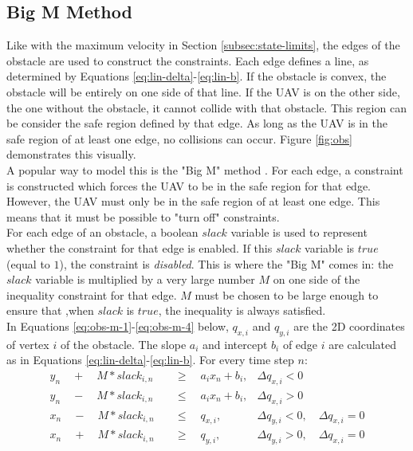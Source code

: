 \subsection{Big M Method}
Like with the maximum velocity in Section \ref{subsec:state-limits}, the edges of the obstacle are used to construct the constraints. Each edge defines a line, as determined by Equations \ref{eq:lin-delta}-\ref{eq:lin-b}. If the obstacle is convex, the obstacle will be entirely on one side of that line. If the UAV is on the other side, the one without the obstacle, it cannot collide with that obstacle. This region can be consider the safe region defined by that edge. As long as the UAV is in the safe region of at least one edge, no collisions can occur. Figure \ref{fig:obs} demonstrates this visually. \\
A popular way to model this is the "Big M" method \cite{Schouwenaars2001}. For each edge, a constraint is constructed which forces the UAV to be in the safe region for that edge. However, the UAV must only be in the safe region of at least one edge. This means that it must be possible to "turn off" constraints. \\
For each edge of an obstacle, a boolean $slack$ variable is used to represent whether the constraint for that edge is enabled. If this $slack$ variable is $true$ (equal to $1$), the constraint is \emph{disabled}. This is where the "Big M" comes in: the $slack$ variable is multiplied by a very large number $M$ on one side of the inequality constraint for that edge. $M$ must be chosen to be large enough to ensure that ,when $slack$ is $true$, the inequality is always satisfied. \\
In Equations \ref{eq:obs-m-1}-\ref{eq:obs-m-4} below, $q_{x,i}$ and $q_{y,i}$ are the 2D coordinates of vertex $i$ of the obstacle. The slope $a_{i}$ and intercept $b_{i}$ of edge $i$ are calculated as in Equations \ref{eq:lin-delta}-\ref{eq:lin-b}. For every time step $n$:
\begin{align}
y_{n} \quad + \quad M*slack_{i,n} \quad &\geq 
\quad a_{i} x_{n} + b_{i},  	
& \Delta q_{x,i} < 0 							 	
\label{eq:obs-m-1} \\
y_{n} \quad - \quad M*slack_{i,n} \quad &\leq 
\quad a_{i} x_{n} + b_{i},
& \Delta q_{x,i} > 0 							 	
\label{eq:obs-m-2} \\
x_{n} \quad - \quad M*slack_{i,n} \quad &\leq
\quad  q_{x,i}, 		
& \Delta q_{y,i} < 0, \quad \Delta q_{x,i} = 0 	
\label{eq:obs-m-3} \\
x_{n} \quad + \quad M*slack_{i,n} \quad &\geq 
\quad q_{y,i},  		
& \Delta q_{y,i} > 0, \quad \Delta q_{x,i} = 0 	
\label{eq:obs-m-4}
\end{align}
